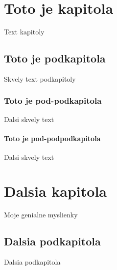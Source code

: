 \documentclass{book}
\begin{document}
\chapter{Toto je kapitola}
Text kapitoly

\section{Toto je podkapitola}
Skvely text podkapitoly

\subsection{Toto je pod-podkapitola}
Dalsi skvely text

\subsubsection{Toto je pod-podpodkapitola}
Dalsi skvely text

\chapter{Dalsia kapitola}

Moje genialne myslienky

\section{Dalsia podkapitola}

Dalsia podkapitola
\end{document}
